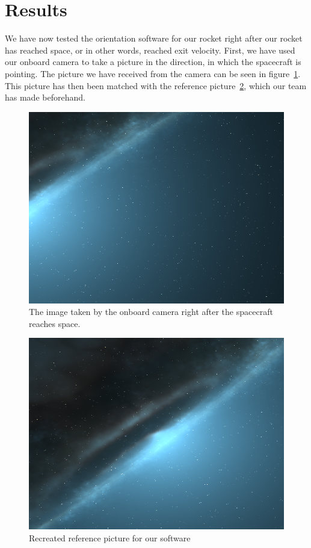 \documentclass[reprint,english,notitlepage]{revtex4-2}
\begin{document}
\section{Results} \label{sec:results}
We have now tested the orientation software for our rocket right after our rocket has reached space, or in other words, reached exit velocity.
First, we have used our onboard camera to take a picture in the direction, in which the spacecraft is pointing.
The picture we have received from the camera can be seen in figure~\ref{fig:sky_picture}.
This picture has then been matched with the reference picture~\ref{fig: ref picture}, which our team has made beforehand.

\begin{figure}[h]
	\centering
	\includegraphics[scale=0.15]{Python/sky_picture}
	\caption{The image taken by the onboard camera right after the spacecraft reaches space.}\label{fig:sky_picture}
\end{figure}

\begin{figure}[h!]
	\centering
	\includegraphics[scale = 0.2]{Test_Image}
	\caption{Recreated reference picture for our software %
	}
	\label{fig: ref picture}
  \end{figure}
\end{document}
